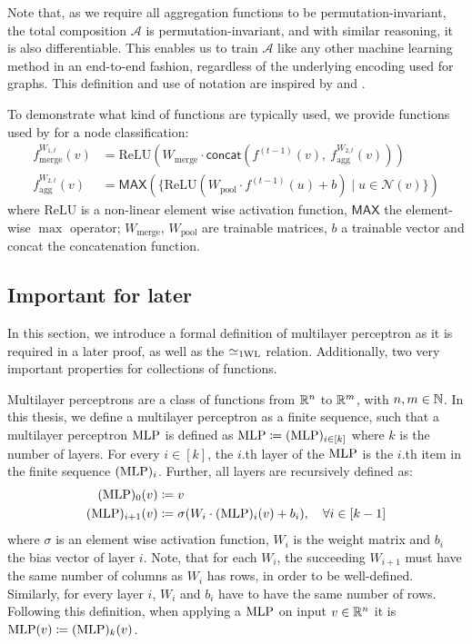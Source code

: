 Note that, as we require all aggregation functions to be permutation-invariant, the total composition $\mathcal{A}$ is permutation-invariant, and with similar reasoning, it is also differentiable. This enables us to train $\mathcal{A}$ like any other machine learning method in an end-to-end fashion, regardless of the underlying encoding used for graphs. This definition and use of notation are inspired by \cite{Morris2018} and \cite{Xu2018}.

To demonstrate what kind of functions are typically used, we provide functions used by \cite{Ham+2017} for a node classification:
\begin{align*}
    f^{W_{1,t}}_{\text{merge}}(v) &= \text{ReLU} (W_{\text{merge}} \cdot \textsf{concat}(f^{(t-1)}(v), \ f^{W_{2,t}}_{\text{agg}}(v)))\\
    f^{W_{2,t}}_{\text{agg}}(v) &= \textsf{MAX}(\{ \text{ReLU}(W_{\text{pool}} \cdot f^{(t-1)}(u) + b) \mid u \in \mathcal{N}(v)\})
\end{align*}
where $\text{ReLU}$ is a non-linear element wise activation function, $\textsf{MAX}$ the element-wise $\max$ operator; $W_{\text{merge}}$, $W_{\text{pool}}$ are trainable matrices, $b$ a trainable vector and \textsf{concat} the concatenation function.



\subsection{Important for later}
In this section, we introduce a formal definition of multilayer perceptron as it is required in a later proof, as well as the $\simeq_{\text{1WL}}$ relation. Additionally, two very important properties for collections of functions.

\begin{definition}\label{def:mlp}
    Multilayer perceptrons are a class of functions from $\mathbb{R}^n$ to $\mathbb{R}^m$, with $n,m \in \mathbb{N}$. In this thesis, we define a multilayer perceptron as a finite sequence, such that a multilayer perceptron $\text{MLP}$ is defined as $\text{MLP} \coloneqq (\text{MLP})_{i\in[k]}$ where $k$ is the number of layers. For every $i \in [k]$, the $i$.th layer of the $\text{MLP}$ is the $i$.th item in the finite sequence $(\text{MLP})_i$. Further, all layers are recursively defined as:
    \begin{align*}
        (\text{MLP})_{0}(v) &\coloneqq v\\
        (\text{MLP})_{i+1}(v) &\coloneqq \sigma(W_i \cdot (\text{MLP})_{i} (v) + b_i), \quad \forall i \in [k-1]
    \end{align*}
    where $\sigma$ is an element wise activation function, $W_i$ is the weight matrix and $b_i$ the bias vector of layer $i$. Note, that for each $W_i$, the succeeding $W_{i+1}$ must have the same number of columns as $W_i$ has rows, in order to be well-defined. Similarly, for every layer $i$, $W_i$ and $b_i$ have to have the same number of rows.
    Following this definition, when applying a $\text{MLP}$ on input $v \in \mathbb{R}^n$ it is $\text{MLP}(v) \coloneqq (\text{MLP})_k(v)$.
\end{definition}

